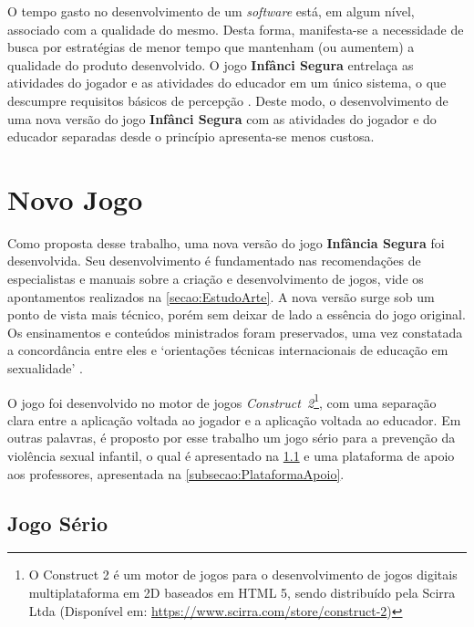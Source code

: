 \documentclass[alpha-refs,brazilian]{RBCA_v2.0}
\begin{document}
O tempo gasto no desenvolvimento de um \textit{software} está, em algum nível, associado com a qualidade do mesmo. Desta forma, manifesta-se a necessidade de busca por estratégias de menor tempo que mantenham (ou aumentem) a qualidade do produto desenvolvido. O jogo \textbf{Infânci Segura} entrelaça as atividades do jogador e as atividades do educador em um único sistema, o que descumpre requisitos básicos de percepção \citep{mantau2013analise}. Deste modo, o desenvolvimento de uma nova versão do jogo \textbf{Infânci Segura} com as atividades do jogador e do educador separadas desde o princípio apresenta-se menos custosa.

\pagebreak

\section{Novo Jogo}\label{secao:InfanciaSegura2.0}

Como proposta desse trabalho, uma nova versão do jogo \textbf{Infância Segura} foi desenvolvida. Seu desenvolvimento é fundamentado nas recomendações de especialistas e manuais sobre a criação e desenvolvimento de jogos, vide os apontamentos realizados na \cref{secao:EstudoArte}. A nova versão surge sob um ponto de vista mais técnico, porém sem deixar de lado a essência do jogo original. Os ensinamentos e conteúdos ministrados foram preservados, uma vez constatada a concordância entre eles e `orientações técnicas internacionais de educação em sexualidade' \citep{women2018international}.

O jogo foi desenvolvido no motor de jogos \mbox{\textit{Construct 2}}\footnote{O Construct 2 é um motor de jogos para o desenvolvimento de jogos digitais multiplataforma em 2D baseados em HTML 5, sendo distribuído pela Scirra Ltda (Disponível em: \underline{\url{https://www.scirra.com/store/construct-2}})}, com uma separação clara entre a aplicação voltada ao jogador e a aplicação voltada ao educador. Em outras palavras, é proposto por esse trabalho um jogo sério para a prevenção da violência sexual infantil, o qual é apresentado na \cref{subsecao:JogoEducacional} e uma plataforma de apoio aos professores, apresentada na \cref{subsecao:PlataformaApoio}. %


\subsection{Jogo Sério}\label{subsecao:JogoEducacional}
\end{document}
